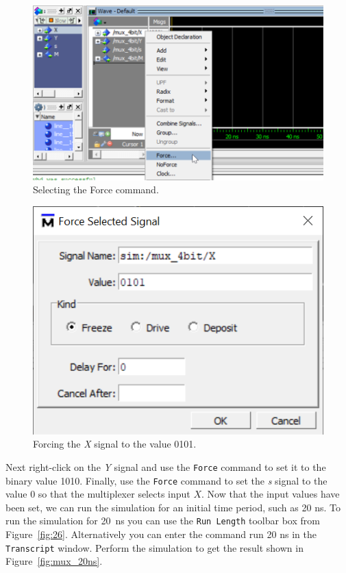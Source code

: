 \documentclass[11pt, twoside, pdftex]{article}
\begin{document}
\begin{figure}[H]
   \begin{center}
      \includegraphics[scale=.75]{figures/mux_force.png}
       \caption{Selecting the {\sf Force} command.} 
	 \label{fig:mux_force}
	 \end{center}
\end{figure}

\begin{figure}[H]
   \begin{center}
      \includegraphics[scale=.75]{figures/mux_force_5.png}
       \caption{Forcing the {\it X} signal to the value 0101.} 
	 \label{fig:mux_force_5}
	 \end{center}
\end{figure}

Next right-click on the {\it Y} signal and use the \texttt{Force} command to set it to the
binary value 1010. Finally, use the \texttt{Force} command to set the {\it s} signal to
the value 0 so that the multiplexer selects input $X$. 
Now that the input values have been set, we can run the simulation for an
initial time period, such as 20 ns. To run the simulation for 20~ns you can use the \texttt{Run
Length} toolbar box from Figure~\ref{fig:26}. Alternatively you can enter the command 
{\sf run 20 ns} in the \texttt{Transcript} window. Perform the simulation to get the result 
shown in Figure~\ref{fig:mux_20ns}.
\end{document}
